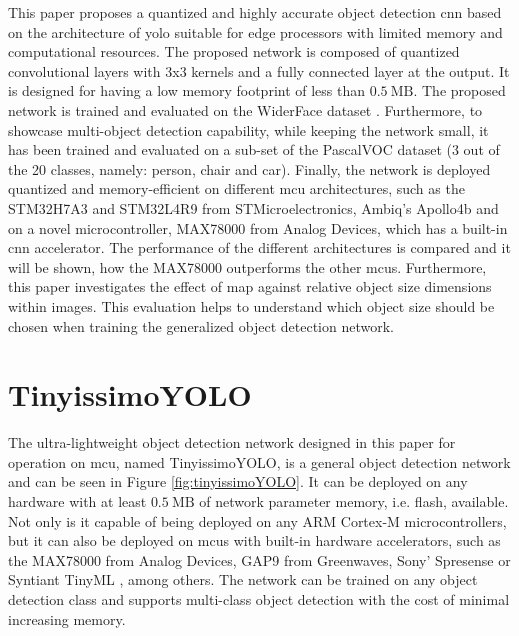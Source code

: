 \documentclass[conference]{IEEEtran}
\begin{document}
This paper proposes a quantized and highly accurate object detection \gls{cnn} based on the architecture of \gls{yolo} \cite{redmon_you_2016} suitable for edge processors with limited memory and computational resources. The proposed network is composed of quantized convolutional layers with 3x3 kernels and a fully connected layer at the output. It is designed for having a low memory footprint of less than $\SI{0.5}{\text{MB}}$. The proposed network is trained and evaluated on the WiderFace dataset \cite{yang_wider_2016}. Furthermore, to showcase multi-object detection capability, while keeping the network small, it has been trained and evaluated on a sub-set of the PascalVOC \cite{everingham_pascal_2015} dataset (3 out of the 20 classes, namely: person, chair and car). Finally, the network is deployed quantized and memory-efficient on different \gls{mcu} architectures, such as the STM32H7A3 and STM32L4R9 from STMicroelectronics, Ambiq's Apollo4b and on a novel microcontroller, MAX78000 from Analog Devices, which has a built-in \gls{cnn} accelerator. The performance of the different architectures is compared and it will be shown, how the MAX78000 outperforms the other \glspl{mcu}. Furthermore, this paper investigates the effect of \gls{map} against relative object size dimensions within images. This evaluation helps to understand which object size should be chosen when training the generalized object detection network. 



\section{TinyissimoYOLO}
The ultra-lightweight object detection network designed in this paper for operation on \gls{mcu}, named TinyissimoYOLO, is a general object detection network and can be seen in Figure \ref{fig:tinyissimoYOLO}. It can be deployed on any hardware with at least $\SI{0.5}{\text{MB}}$ of network parameter memory, i.e. flash, available. Not only is it capable of being deployed on any ARM Cortex-M microcontrollers, but it can also be deployed on \glspl{mcu} with built-in hardware accelerators, such as the MAX78000 from Analog Devices, GAP9 \cite{reuther_survey_2020} from Greenwaves, Sony' Spresense \cite{noauthor_overview_nodate-1} or Syntiant TinyML \cite{yousefi_intelligence_2019}, among others. The network can be trained on any object detection class and supports multi-class object detection with the cost of minimal increasing memory.
\end{document}
